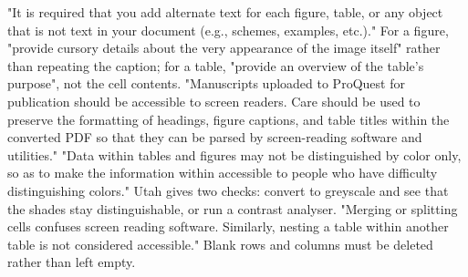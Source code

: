 
	{"It is required that you add alternate text for each figure, table, or any
	 object that is not text in your document (e.g., schemes, examples, etc.)."
	 For a figure, "provide cursory details about the very appearance of the
	 image itself" rather than repeating the caption; for a table, "provide an
	 overview of the table's purpose", not the cell contents.}
	{"Manuscripts uploaded to ProQuest for publication should be accessible to
	 screen readers. Care should be used to preserve the formatting of headings,
	 figure captions, and table titles within the converted PDF so that they can
	 be parsed by screen-reading software and utilities."}
	{"Data within tables and figures may not be distinguished by color only, so
	 as to make the information within accessible to people who have difficulty
	 distinguishing colors." Utah gives two checks: convert to greyscale and see
	 that the shades stay distinguishable, or run a contrast analyser.}
	{"Merging or splitting cells confuses screen reading software. Similarly,
	 nesting a table within another table is not considered accessible." Blank
	 rows and columns must be deleted rather than left empty.}

